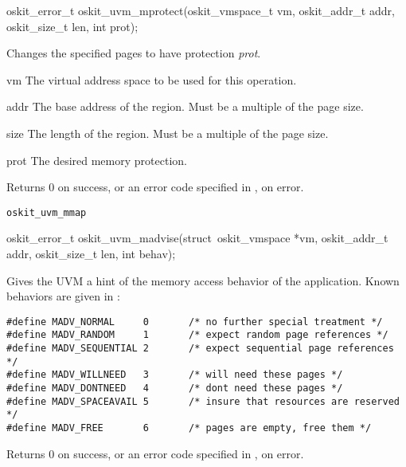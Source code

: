 \begin{apisyn}

        \funcproto oskit_error_t oskit_uvm_mprotect(oskit_vmspace_t vm, oskit_addr_t addr,
                                   oskit_size_t len, int prot);
\end{apisyn}
\begin{apidesc}
        Changes the specified pages to have protection \emph{prot}.
\end{apidesc}
\begin{apiparm}
        \item[vm]
                The virtual address space to be used for this operation.

        \item[addr]
                The base address of the region.  Must be a multiple of
                the page size.

        \item[size]
                The length of the region.  Must be a multiple of the page size.

        \item[prot]
                The desired memory protection.
\end{apiparm}
\begin{apiret}
        Returns 0 on success, or an error code specified in
        , on error.
\end{apiret}
\begin{apirel}
        {\tt oskit_uvm_mmap}
\end{apirel}

\begin{apisyn}

        \funcproto oskit_error_t oskit_uvm_madvise(struct~oskit_vmspace *vm, oskit_addr_t addr,
                                  oskit_size_t len, int behav);
\end{apisyn}
\begin{apidesc}
        Gives the UVM a hint of the memory access behavior of the
        application.  Known behaviors are given in
        :
\begin{verbatim}
#define MADV_NORMAL     0       /* no further special treatment */
#define MADV_RANDOM     1       /* expect random page references */
#define MADV_SEQUENTIAL 2       /* expect sequential page references */
#define MADV_WILLNEED   3       /* will need these pages */
#define MADV_DONTNEED   4       /* dont need these pages */
#define MADV_SPACEAVAIL 5       /* insure that resources are reserved */
#define MADV_FREE       6       /* pages are empty, free them */
\end{verbatim}
\end{apidesc}
\begin{apiret}
        Returns 0 on success, or an error code specified in
        , on error.
\end{apiret}

